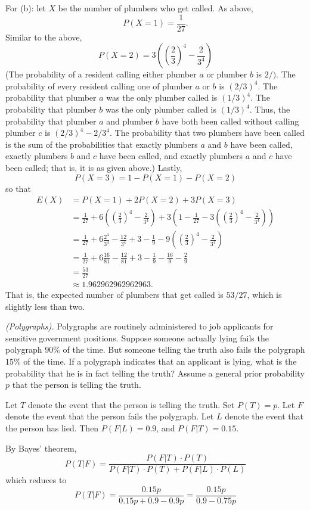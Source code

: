 \begin{solution}
  For (b): let $X$ be the number of plumbers who get called.  As above,
  \[
    P(X = 1)=\frac{1}{27}.
  \]
  Similar to the above,
  \[
    P(X = 2) = 3\left(\left(\frac{2}{3}\right)^4 - \frac{2}{3^4}
    \right)
  \]
  (The probability of a resident calling either plumber $a$ or plumber $b$
  is $2/)$. The probability of every resident calling one of plumber $a$ or
  $b$ is $(2/3)^4$. The probability that plumber $a$ was the only plumber
  called is $(1/3)^4$. The probability that plumber $b$ was the only
  plumber called is $(1/3)^4$. Thus, the probability that plumber $a$ and
  plumber $b$ have both been called without calling plumber $c$ is
  $(2/3)^4-2/3^4$. The probability that two plumbers have been called is
  the sum of the probabilities that exactly plumbers $a$ and $b$ have been
  called, exactly plumbers $b$ and $c$ have been called, and exactly
  plumbers $a$ and $c$ have been called; that is, it is as given above.)
  Lastly,
  \[
    P(X = 3) = 1-P(X = 1)-P(X = 2)
  \]
  so that
  \begin{align*}
    E(X) &= P(X=1) + 2P(X=2) + 3P(X = 3) \\
             &= \frac{1}{27} + 6\left(\left(\frac{2}{3}\right)^4 - \frac{2}{3^4} \right) + 3\left(1-\frac{1}{27} -  3\left(\left(\frac{2}{3}\right)^4 - \frac{2}{3^4} \right)\right) \\
             &= \frac{1}{27} + 6\frac{2^4}{3^4} - \frac{12}{3^4} + 3-\frac{1}{9} -  9\left(\left(\frac{2}{3}\right)^4 - \frac{2}{3^4} \right)\\
             &= \frac{1}{27} + 6\frac{16}{81} - \frac{12}{81} + 3-\frac{1}{9} -  \frac{16}{9} - \frac{2}{9}\\
             &= \frac{53}{27}\\
             &\approx\num{1.962962962962963}.
  \end{align*}
  That is, the expected number of plumbers that get called is $53/27$,
  which is slightly less than two.
\end{solution}
\newpage

\begin{problem}[Handout 4, \# 7]
  \emph{(Polygraphs).} Polygraphs are routinely administered to job
  applicants for sensitive government positions. Suppose someone actually
  lying fails the polygraph \(90\%\) of the time. But someone telling the
  truth also fails the polygraph \(15\%\) of the time. If a polygraph
  indicates that an applicant is lying, what is the probability that he is
  in fact telling the truth? Assume a general prior probability \(p\) that
  the person is telling the truth.
\end{problem}
\begin{solution}
  Let $T$ denote the event that the person is telling the truth. Set
  $P(T) = p$. Let $F$ denote the event that the person fails the
  polygraph. Let $L$ denote the event that the person has lied. Then
  $P(F|L) = 0.9$, and $P(F|T) = 0.15$.

  By Bayes' theorem,
  \[
    P(T|F) = \frac{P(F|T) \cdot P(T)}{P(F|T)
      \cdot P(T) + P(F|L) \cdot P(L)}
  \]
  which reduces to
  \[
    P(T|F) = \frac{0.15p}{0.15p + 0.9 - 0.9p} = \frac{0.15p}{0.9 -
      0.75p}
  \]
\end{solution}
\newpage

